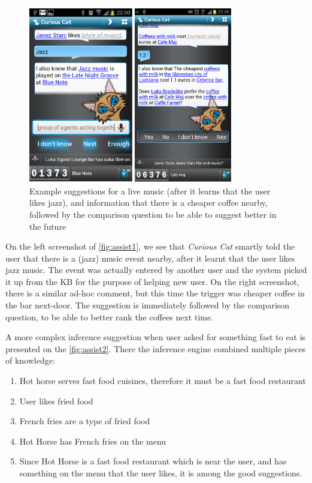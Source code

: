 \begin{figure}[htb]
	\centering
		\includegraphics[width=0.8\textwidth]{figures/assistExample1.png}
	\caption{Example suggestions for a live music (after it learns that the user likes jazz), and information that there is a cheaper coffee nearby, followed by the comparison question to be able to suggest better in the future}
	\label{fig:assist1}
\end{figure}

On the left screenshot of \autoref{fig:assist1}, we see that \emph{Curious Cat}
smartly told the user that there is a (jazz) music event nearby, after it 
learnt that the user likes jazz music. The event was actually entered by 
another user and the system picked it up from the KB for the purpose of 
helping new user. On the right screenshot, there is a similar ad-hoc comment, 
but this time the trigger was cheaper coffee in the bar next-door. The 
suggestion is immediately followed by the comparison question, to be able to 
better rank the coffees next time.

A more complex inference suggestion when user asked for something fast to eat 
is presented on the \autoref{fig:assist2}. There the inference engine combined 
multiple pieces of knowledge:
\begin{enumerate}
\item Hot horse serves fast food cuisines, therefore it must be a fast food 
restaurant
\item User likes fried food
\item French fries are a type of fried food
\item Hot Horse has French fries on the menu
\item Since Hot Horse is a fast food restaurant which is near the user, and has 
something on the menu that the user likes, it is among the good suggestions.
\end{enumerate}

